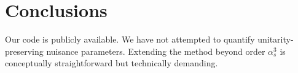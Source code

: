 \section{Conclusions}\label{sec:conclusions}

Our code is publicly available. We have not attempted to quantify
unitarity-preserving nuisance parameters. Extending the method beyond
order $\alpha_s^3$ is conceptually straightforward but technically
demanding.

